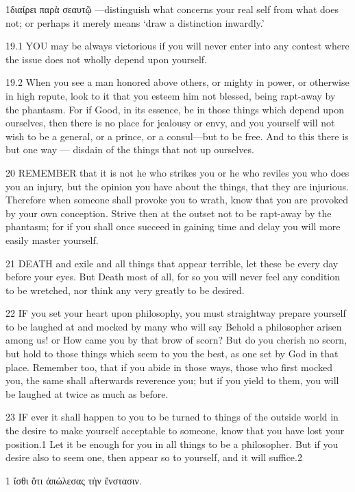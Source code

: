    1διαίρει παρὰ σεαυτῷ —distinguish what concerns your real self from what does not; or perhaps it merely means  ‘draw a distinction inwardly.’

   19.1   YOU may be always victorious if you will never enter into any contest where the issue does not  wholly depend upon yourself.

   19.2   When you see a man honored above others, or mighty in power, or otherwise in high repute, look to it that you esteem him not blessed, being  rapt-away by the phantasm.  For if Good, in its essence, be in those things which depend upon ourselves, then there is no place for jealousy or envy, and you yourself will not wish to be a general, or a prince, or a consul—but to be free.  And to this there is but one way — disdain of the things that not up ourselves.

   20   REMEMBER that it is not he who strikes you or he who reviles you who does you an injury, but the opinion you have about the things, that they are injurious.  Therefore when someone shall provoke you to wrath, know that you are provoked by your own conception. Strive then at the outset not to be rapt-away by the phantasm; for if you shall once succeed in gaining time and delay you will more easily master yourself.

   21   DEATH and exile and all things that appear terrible, let these be every day before your eyes.  But Death most of all, for so you will never feel any condition to be wretched, nor think any very greatly to be desired.

   22   IF you set your heart upon philosophy, you must straightway prepare yourself to be laughed at and mocked by many who will say Behold a philosopher  arisen among us! or How came you by that brow of scorn? But do you cherish no scorn, but hold to those things which seem to you the best, as one set by God in that place. Remember too, that if you abide in those ways, those who first mocked you, the same shall afterwards reverence you; but if you yield to them, you will be laughed at twice as much as before.

   23   IF ever it shall happen to you to be turned to things of the outside world in the desire to make yourself acceptable to someone, know that you have lost your position.1  Let it be enough for you in all things to be a philosopher. But if you desire also to seem one, then appear so to yourself, and it will suffice.2

   1 ἴσθι ὅτι ἀπώλεσας τὴν ἔνστασιν.

